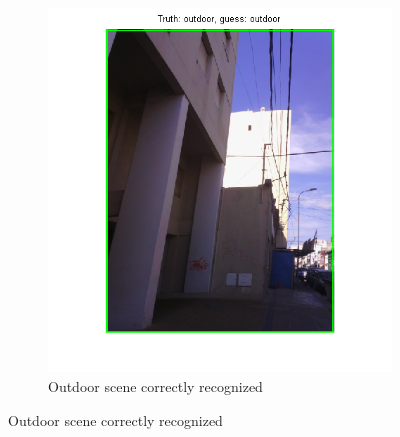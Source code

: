 \begin{figure}[!htb]
\begin{subfigure}[t]{0.4\textwidth}
		\includegraphics[width=\textwidth]{./img/ex2/outdoor-nailed.png}
		\caption{Outdoor scene correctly recognized}
		\label{fig:outdoor-nailed}
	\end{subfigure}
	

\end{figure}
